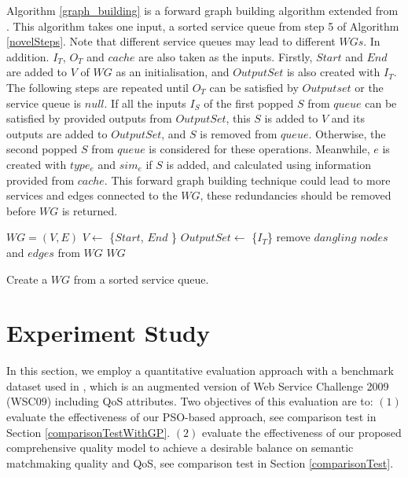 \documentclass{llncs}
\begin{document}
\vspace{-0.5cm}
Algorithm  \ref{graph_building} is a forward graph building algorithm extended from \cite{blum1997fast}. This algorithm takes one input, a sorted service queue from step 5 of Algorithm \ref{novelSteps}. Note that different service queues may lead to different $WGs$. In addition. $I_{T}$, $O_{T}$ and $cache$ are also taken as the inputs. Firstly, $Start$ and $End$ are added to $V$ of $WG$ as an initialisation, and $OutputSet$ is also created with $I_{T}$. The following steps are repeated until $O_{T}$ can be satisfied by $Outputset$ or the service queue is $null$. If all the inputs $I_{S}$ of the first popped  $S$ from $queue$ can be satisfied by provided outputs from $OutputSet$, this $S$ is added to $V$ and its outputs are added to $OutputSet$, and $S$ is removed from $queue$. Otherwise, the second popped  $S$ from $queue$ is considered for these operations. Meanwhile, $e$ is created with $type_e$ and $sim_e$ if $S$ is added, and calculated using information provided from $cache$. This forward graph building technique could lead to more services and edges connected to the $WG$, these redundancies should be removed before $WG$ is returned.
\vspace{-0.5cm}

\begin{algorithm}
 \SetNlSty{}{}{:}
 $WG = (V, E)$\;
 $V \leftarrow$ \{$Start$, $End$ \}\;
 $OutputSet \leftarrow$ \{$I_{T}$\}\;
 remove $dangling$ $nodes$ and $edges$ from $WG$\; 
 \KwRet $WG$\;
 \caption{Create a $WG$ from a sorted service queue.}
\label{graph_building}
\end{algorithm} 

\vspace{-1.2cm}

\section{Experiment Study}\label{experiment_design}
In this section, we employ a quantitative evaluation approach with a benchmark dataset used in \cite{ma2015hybrid,da2016genetic}, which is an augmented version of Web Service Challenge 2009 (WSC09) including QoS attributes. Two objectives of this evaluation are to: $(1)$ evaluate the effectiveness of our PSO-based approach, see comparison test in Section \ref{comparisonTestWithGP}. $(2)$ evaluate the effectiveness of our proposed comprehensive quality model to achieve a desirable balance on semantic matchmaking quality and QoS, see comparison test in Section \ref{comparisonTest}.
\end{document}
